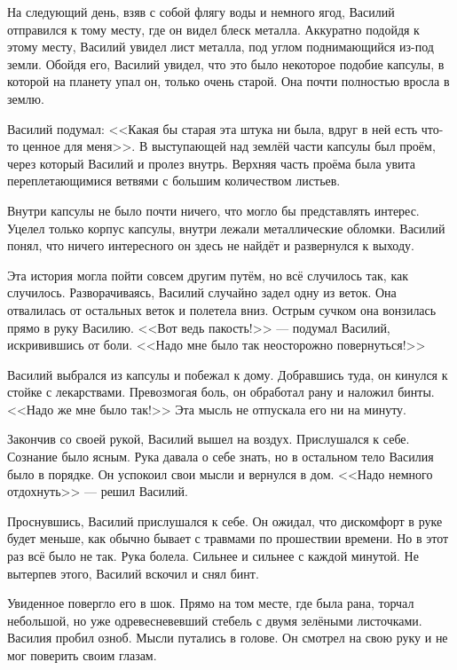 \documentclass[12pt]{article}
\begin{document}

На следующий день, взяв с собой флягу воды и немного ягод, Василий отправился
к тому месту, где он видел блеск металла. Аккуратно подойдя к этому месту,
Василий увидел лист металла, под углом поднимающийся из-под земли.
Обойдя его, Василий увидел, что это было некоторое подобие капсулы, в которой
на планету упал он, только очень старой. Она почти полностью вросла в землю.

Василий подумал: <<Какая бы старая эта штука ни была, вдруг в ней есть что-то
ценное для меня>>. В выступающей над землёй части капсулы был проём, через
который Василий и пролез внутрь. Верхняя часть проёма была увита
переплетающимися ветвями с большим количеством листьев.

Внутри капсулы не было почти ничего, что могло бы представлять интерес.
Уцелел только корпус капсулы, внутри лежали металлические обломки.
Василий понял, что ничего интересного он здесь не найдёт и развернулся к
выходу.

Эта история могла пойти совсем другим путём, но всё случилось так, как
случилось. Разворачиваясь, Василий случайно задел одну из веток. Она
отвалилась от остальных веток и полетела вниз. Острым сучком она вонзилась
прямо в руку Василию. <<Вот ведь пакость!>> --- подумал Василий, искривившись
от боли. <<Надо мне было так неосторожно повернуться!>>

Василий выбрался из капсулы и побежал к дому. Добравшись туда, он кинулся
к стойке с лекарствами. Превозмогая боль, он обработал рану и наложил
бинты. <<Надо же мне было так!>> Эта мысль не отпускала его ни на минуту.

Закончив со своей рукой, Василий вышел на воздух. Прислушался к себе.
Сознание было ясным. Рука давала о себе знать, но в остальном тело Василия
было в порядке. Он успокоил свои мысли и вернулся в дом.
<<Надо немного отдохнуть>> --- решил Василий.


Проснувшись, Василий прислушался к себе. Он ожидал, что дискомфорт в руке
будет меньше, как обычно бывает с травмами по прошествии времени. Но
в этот раз всё было не так. Рука болела. Сильнее и сильнее с каждой минутой.
Не вытерпев этого, Василий вскочил и снял бинт.

Увиденное повергло его в шок. Прямо на том месте, где была рана, торчал
небольшой, но уже одревесневевший стебель с двумя зелёными листочками.
Василия пробил озноб. Мысли путались в голове. Он смотрел на свою
руку и не мог поверить своим глазам.
\end{document}
